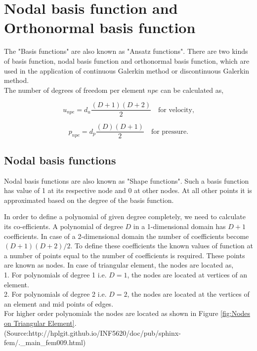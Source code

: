 \documentclass[a4paper,twoside,openright]{book}
\begin{document}
\section[Basis function]{Nodal basis function and Orthonormal basis function}

The "Basis functions" are also known as "Ansatz functions". There are two kinds of basis function, nodal basis function and orthonormal basis function, which are used in the application of continuous Galerkin method or discontinuous Galerkin method. \\

The number of degrees of freedom per element $npe$ can be calculated as,

\begin{equation} \label{unpe}
u_{npe} = d_u \frac{(D+1)(D+2)}{2} \quad \textrm{for velocity} \textrm{,}
\end{equation} 

\begin{equation} \label{pnpe}
p_{npe} = d_p \frac{(D)(D+1)}{2} \quad \textrm{for pressure} \textrm{.}
\end{equation} 


\subsection{Nodal basis functions}

Nodal basis functions are also known as "Shape functions". Such a basis function has value of 1 at its respective node and 0 at other nodes. At all other points it is approximated based on the degree of the basis function. 

In order to define a polynomial of given degree completely, we need to calculate its co-efficients. A polynomial of degree $D$ in a 1-dimensional domain has $D+1$ coefficients. In case of a 2-dimensional domain the number of coefficients become $(D+1)(D+2)/2$. To define these coefficients the known values of function at a number of points equal to the number of coefficients is required. These points are known as nodes. In case of triangular element, the nodes are located as,\\
1. For polynomials of degree 1 i.e. $D=1$, the nodes are located at vertices of an element.\\
2. For polynomials of degree 2 i.e. $D=2$, the nodes are located at the vertices of an element and mid points of edges.\\

For higher order polynomials the nodes are located as shown in Figure \ref{fig:Nodes on Triangular Element}. (Source:http://hplgit.github.io/INF5620/doc/pub/sphinx-fem/.\_main\_fem009.html)  
\end{document}
